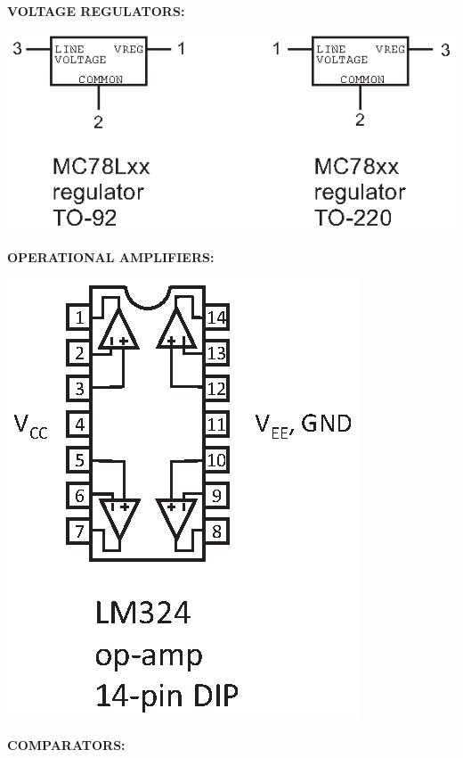 \medskip
\textbf{VOLTAGE REGULATORS:}

\hspace{0.25in}\includegraphics{appendices/pinouts/regulator_pinouts.eps}

\medskip
\textbf{OPERATIONAL AMPLIFIERS:}

\hspace{0.25in}\includegraphics[scale=0.8]{appendices/pinouts/lm324.eps}

\pagebreak

\textbf{COMPARATORS:}

